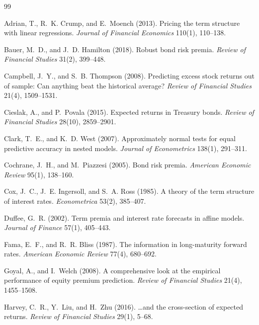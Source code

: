 \documentclass[11pt]{article}
\begin{document}
\begin{thebibliography}{99}\small

 Adrian, T., R.~K. Crump, and E.~Moench (2013).
Pricing the term structure with linear regressions. \emph{Journal of Financial
Economics} 110(1), 110--138.

 Bauer, M.~D., and J.~D. Hamilton (2018).
Robust bond risk premia. \emph{Review of Financial Studies} 31(2), 399--448.

 Campbell, J.~Y., and S.~B.
Thompson (2008). Predicting excess stock returns out of sample: Can anything beat the
historical average? \emph{Review of Financial Studies} 21(4), 1509--1531.

 Cieslak, A., and P.~Povala (2015).
Expected returns in Treasury bonds. \emph{Review of Financial Studies} 28(10), 2859--2901.

 Clark, T.~E., and K.~D. West (2007).
Approximately normal tests for equal predictive accuracy in nested models.
\emph{Journal of Econometrics} 138(1), 291--311.

 Cochrane, J.~H., and M.~Piazzesi
(2005). Bond risk premia. \emph{American Economic Review} 95(1), 138--160.

 Cox, J.~C., J.~E. Ingersoll, and S.~A. Ross (1985).
A theory of the term structure of interest rates. \emph{Econometrica} 53(2), 385--407.

 Duffee, G.~R. (2002). Term premia and interest rate
forecasts in affine models. \emph{Journal of Finance} 57(1), 405--443.

 Fama, E.~F., and R.~R. Bliss (1987).
The information in long-maturity forward rates. \emph{American Economic Review} 77(4),
680--692.

 Goyal, A., and I.~Welch (2008).
A comprehensive look at the empirical performance of equity premium prediction.
\emph{Review of Financial Studies} 21(4), 1455--1508.

 Harvey, C.~R., Y.~Liu, and H.~Zhu (2016).
\ldots and the cross-section of expected returns. \emph{Review of Financial Studies}
29(1), 5--68.


\end{thebibliography}
\end{document}
